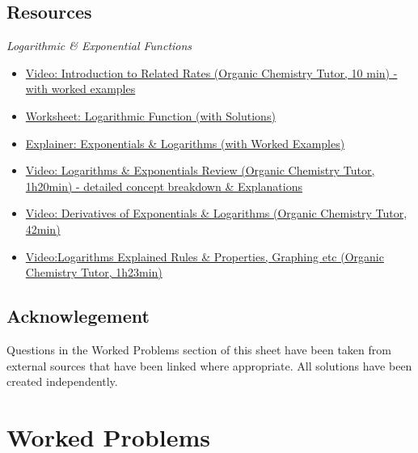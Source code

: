 \documentclass{article}
\begin{document}
\subsection*{Resources}


\noindent\textit{Logarithmic \& Exponential Functions}
\begin{itemize}
    \item \href{https://youtu.be/I9mVUo-bhM8}{Video: Introduction to Related Rates (Organic Chemistry Tutor, 10 min) - with worked examples} 
    \item \href{https://math.colorado.edu/math1300/resources/Exercises_LogarithmicFunction.pdf}{Worksheet: Logarithmic Function (with Solutions)}
    \item \href{http://www.standrewspaisley.com/uploads/6/0/2/3/60230905/exp_and_logs_full_booklet.pdf}{Explainer: Exponentials \& Logarithms (with Worked Examples)}
    \item \href{https://youtu.be/oqHJ5xQYTEI}{Video: Logarithms \& Exponentials Review (Organic Chemistry Tutor, 1h20min) - detailed concept breakdown \& Explanations}
    \item \href{https://youtu.be/zmnh448y_ZU}{Video: Derivatives of Exponentials \& Logarithms (Organic Chemistry Tutor, 42min)}
    \item \href{https://youtu.be/LRbi_pMX1DM}{Video:Logarithms Explained Rules \& Properties, Graphing etc (Organic Chemistry Tutor, 1h23min)}
\end{itemize}


\subsection*{Acknowlegement}
Questions in the Worked Problems section of this sheet have been taken from external sources that have been linked where appropriate. All solutions have been created independently.

\pagebreak
\section*{Worked Problems}
\label{WorkedProblems}
\end{document}
